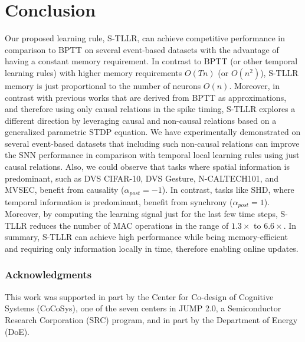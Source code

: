 \documentclass[10pt]{article} %
\begin{document}
\section{Conclusion}\label{sec:conclusion}
Our proposed learning rule, S-TLLR, can achieve competitive performance in comparison to BPTT on several event-based datasets with the advantage of having a constant memory requirement. 
In contrast to BPTT (or other temporal learning rules) with higher memory requirements $O(Tn)$ (or $O(n^2)$), S-TLLR memory is just proportional to the number of neurons $O(n)$.
Moreover, in contrast with previous works that are derived from BPTT as approximations, and therefore using only causal relations in the spike timing, S-TLLR explores a different direction by leveraging causal and non-causal relations based on a generalized parametric STDP equation.
We have experimentally demonstrated on several event-based datasets that including such non-causal relations can improve the SNN performance in comparison with temporal local learning rules using just causal relations. 
Also, we could observe that tasks where spatial information is predominant, such as DVS CIFAR-10, DVS Gesture, N-CALTECH101, and MVSEC, benefit from causality ($\alpha_{post}=-1$).
In contrast, tasks like SHD, where temporal information is predominant, benefit from synchrony ($\alpha_{post}=1$).
Moreover, by computing the learning signal just for the last few time steps,
S-TLLR reduces the number of MAC operations in the range of $1.3\times$ to $6.6\times$.
In summary, S-TLLR can achieve high performance while being memory-efficient and requiring only information locally in time, therefore enabling online updates.
 
\subsubsection*{Acknowledgments}
This work was supported in part by the Center for Co-design of Cognitive Systems (CoCoSys), one of the seven centers in JUMP 2.0, a Semiconductor Research Corporation (SRC) program, and in part by the Department of Energy (DoE).

\end{document}
